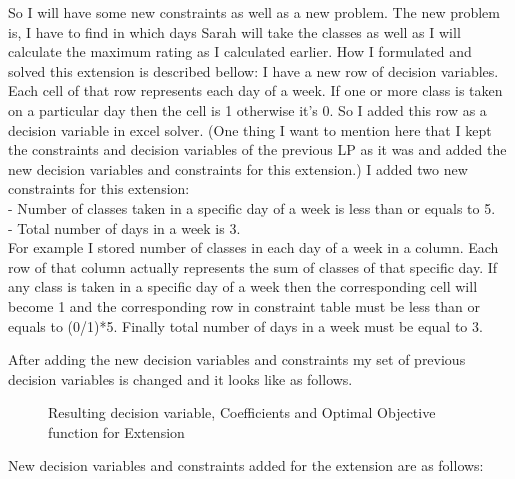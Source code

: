 \documentclass[paper=letter, fontsize=11pt]{scrartcl} %
\begin{document}
So I will have some new constraints as well as a new problem. The new problem is, I have to find in which days Sarah will take the classes as well as I will calculate the maximum rating as I calculated earlier. How I formulated and solved this extension is described bellow:\newline
I have a new row of decision variables. Each cell of that row represents each day of a week. If one or more class is taken on a particular day then the cell is 1 otherwise it's 0. So I added this row as a decision variable in excel solver. (One thing I want to mention here that I kept the constraints and decision variables of the previous LP as it was and added the new decision variables and constraints for this extension.)
I added two new constraints for this extension:\\
- Number of classes taken in a specific day of a week is less than or equals to 5.\\
- Total number of days in a week is 3.\\

For example I stored number of classes in each day of a week in a column. Each row of that column actually represents the sum of classes of that specific day. If any class is taken in a specific day of a week then the corresponding cell will become 1 and the corresponding row in constraint table must be less than or equals to (0/1)*5.  Finally total number of days in a week must be equal to 3. 

After adding the new decision variables and constraints my set of previous decision variables is changed and it looks like as follows.
\begin{figure}[H]
  
  \centering
    \caption{Resulting decision variable, Coefficients and Optimal Objective function for Extension}
\end{figure}
\newline
New decision variables and constraints added for the extension are as follows:
\end{document}
